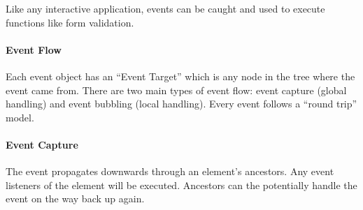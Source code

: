 Like any interactive application, events can be caught and used to execute functions like form validation.

\paragraph{Event Flow}\label{par:event_flow}

Each event object has an ``Event Target'' which is any node in the tree where the event came from.
There are two main types of event flow: event capture (global handling) and event bubbling (local handling).
Every event follows a ``round trip'' model.

\paragraph{Event Capture}\label{par:event_capture}

The event propagates downwards through an element's ancestors.
Any event listeners of the element will be executed.
Ancestors can the potentially handle the event on the way back up again.


